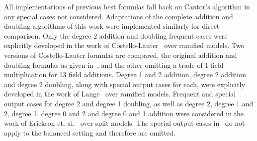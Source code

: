 All implementations of previous best formulas fall back on Cantor's algorithm in
any special cases not considered. Adaptations of the complete addition and
doubling algorithms of this work were implemented similarly for direct
comparison. Only the degree 2 addition and doubling frequent cases were explicitly
developed in the work of Costello-Lauter~\cite{CostelloLauter_geo_2011} over
ramified models. Two versions of Costello-Lauter formulas are compared, the
original addition and doubling formulas as given
in~\cite{CostelloLauter_geo_2011}, and the other omitting a trade of 1 field
multiplication for 13 field additions. Degree 1 and 2 addition, degree 2
addition and degree 2 doubling, along with special output cases for each, were
explicitly developed in the work of Lange~\cite{Lange_explicit_2005} over
ramified models. Frequent and special output cases for degree 2 and degree 1
doubling, as well as degree 2, degree 1 and 2, degree 1, degree 0 and 2 and
degree 0 and 1 addition were considered in the work of
Erickson et. al.~\cite{EricksonJacobsonStein_realg2_2011} over split models. The special
output cases in~\cite{EricksonJacobsonStein_realg2_2011} do not apply to the
balanced setting and therefore are omitted.

